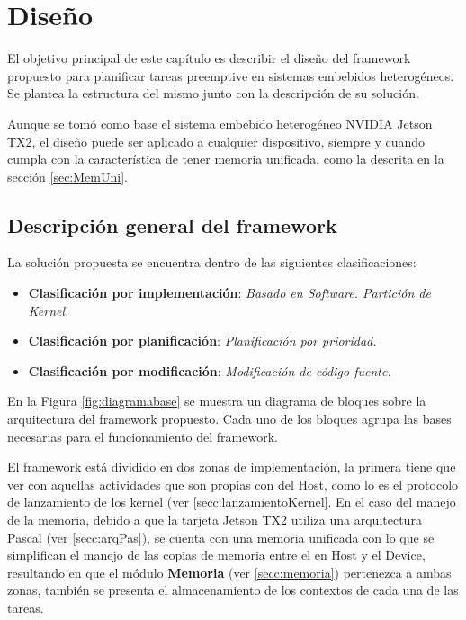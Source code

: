 

\chapter{Diseño}\label{cha:Diseño}

El objetivo principal de este capítulo es describir el diseño del framework propuesto para planificar tareas preemptive en sistemas embebidos heterogéneos. Se plantea la estructura del mismo junto con la descripción de su solución. 
\newline

Aunque se tomó como base el sistema embebido heterogéneo NVIDIA Jetson TX2, el diseño puede ser aplicado a cualquier dispositivo, siempre y cuando cumpla con la característica de tener memoria unificada, como la descrita en la sección \ref{sec:MemUni}.

\section{Descripción general del framework}

La solución propuesta se encuentra dentro de las siguientes clasificaciones:
\begin{itemize}
    \item \textbf{Clasificación por implementación}: \textit{Basado en Software. Partición de Kernel.}
    \item \textbf{Clasificación por planificación}: \textit{Planificación por prioridad.}
    \item \textbf{Clasificación por modificación}: \textit{Modificación de código fuente.}
\end{itemize}

En la Figura \ref{fig:diagramabase} se muestra un diagrama de bloques sobre la arquitectura del framework propuesto. Cada uno de los bloques agrupa las bases necesarias para el funcionamiento del framework.
\newline

El framework está dividido en dos zonas de implementación, la primera tiene que ver con aquellas actividades que son propias con del Host, como lo es el protocolo de lanzamiento de los kernel (ver \ref{secc:lanzamientoKernel}. En el caso del manejo de la memoria, debido a que la tarjeta Jetson TX2 utiliza una arquitectura Pascal (ver \ref{secc:arqPas}), se cuenta con una memoria unificada con lo que se simplifican el manejo de las copias de memoria entre el en Host y el Device, resultando en que el módulo \textbf{Memoria} (ver \ref{secc:memoria}) pertenezca a ambas zonas, también se presenta el almacenamiento de los contextos de cada una de las tareas.
\newline

